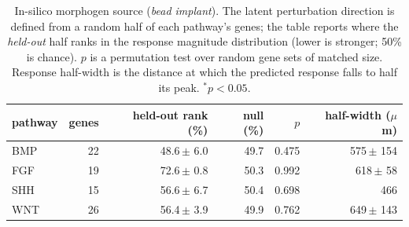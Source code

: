 \begin{table}[htbp]
\centering
\small
\caption{In-silico morphogen source (\emph{bead implant}). The latent perturbation direction is defined from a random half of each pathway's genes; the table reports where the \emph{held-out} half ranks in the response magnitude distribution (lower is stronger; 50\% is chance). $p$ is a permutation test over random gene sets of matched size. Response half-width is the distance at which the predicted response falls to half its peak. $^{*}p<0.05$.}
\label{tab:bead}
\begin{tabular}{lrrrrr}
\toprule
pathway & genes & held-out rank (\%) & null (\%) & $p$ & half-width ($\mu$m)\\
\midrule
BMP & 22 & 48.6\,\tiny{$\pm$ 6.0} & 49.7 & 0.475 & 575\,\tiny{$\pm$ 154} \\
FGF & 19 & 72.6\,\tiny{$\pm$ 0.8} & 50.3 & 0.992 & 618\,\tiny{$\pm$ 58} \\
SHH & 15 & 56.6\,\tiny{$\pm$ 6.7} & 50.4 & 0.698 & 466 \\
WNT & 26 & 56.4\,\tiny{$\pm$ 3.9} & 49.9 & 0.762 & 649\,\tiny{$\pm$ 143} \\
\bottomrule
\end{tabular}
\end{table}
